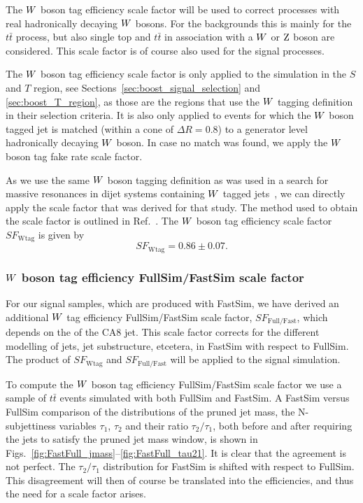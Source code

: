 The $W$ boson tag efficiency scale factor will be used to correct processes with real
hadronically decaying $W$ bosons. For the backgrounds this is mainly for the $t\bar{t}$ process,
but also single top and $t\bar{t}$ in association with a $W$ or $\mathrm{Z}$ boson are considered. This
scale factor is of course also used for the signal processes. 

The $W$ boson tag efficiency scale factor is only applied to the simulation in the $S$ and $T$
region, see Sections~\ref{sec:boost_signal_selection} and \ref{sec:boost_T_region}, as those are the
regions that use the $W$ tagging definition in their selection criteria. It is also only
applied to events for which the $W$ boson tagged jet is matched (within a cone of $\Delta R = 0.8$)
to a generator level hadronically decaying $W$ boson. In case no match was found, we apply the $W$
boson tag fake rate scale factor. 

As we use the same $W$ boson tagging definition as was used in a search for massive resonances in
dijet systems containing $W$ tagged jets~\cite{EXO-12-024}, we can directly apply the scale
factor that was derived for that study. The
method used to obtain the scale factor is outlined in Ref.~\cite{CMS-PAS-JME-13-006}. 
The $W$ boson tag efficiency scale factor $SF_{\textrm{Wtag}}$ is given by
\begin{equation}
SF_{\textrm{Wtag}} = 0.86 \pm 0.07 .
\end{equation}



\subsubsection{\texorpdfstring{$W$}{W} boson tag efficiency FullSim/FastSim scale factor
\label{sec:wtag_eff_fastfull_sf}}

For our signal samples, which are produced with FastSim, we have derived an additional $W$ tag
efficiency FullSim/FastSim scale factor, $SF_{\textrm{Full/Fast}}$, which depends on the \pt
of the CA8 jet. This scale factor corrects for the different modelling of jets, jet
substructure, etcetera, in FastSim with respect to FullSim. The product of $SF_{\textrm{Wtag}}$ and
$SF_{\textrm{Full/Fast}}$ will be applied to the signal simulation. 

To compute the $W$ boson tag efficiency FullSim/FastSim scale factor we use a sample of $t\bar{t}$
events simulated with both FullSim and FastSim. 
A FastSim versus FullSim comparison of the distributions of the pruned jet mass, the N-subjettiness
variables $\tau_1$, $\tau_2$ and their ratio $\tau_2/\tau_1$, both before and after requiring the
jets to satisfy the pruned jet mass window, is shown in
Figs.~\ref{fig:FastFull_jmass}--\ref{fig:FastFull_tau21}. It is clear that the agreement is not
perfect. The $\tau_2/\tau_1$ distribution for FastSim is shifted with respect to FullSim. This
disagreement will then of course be translated into the efficiencies, and thus the need for a scale
factor arises. 


